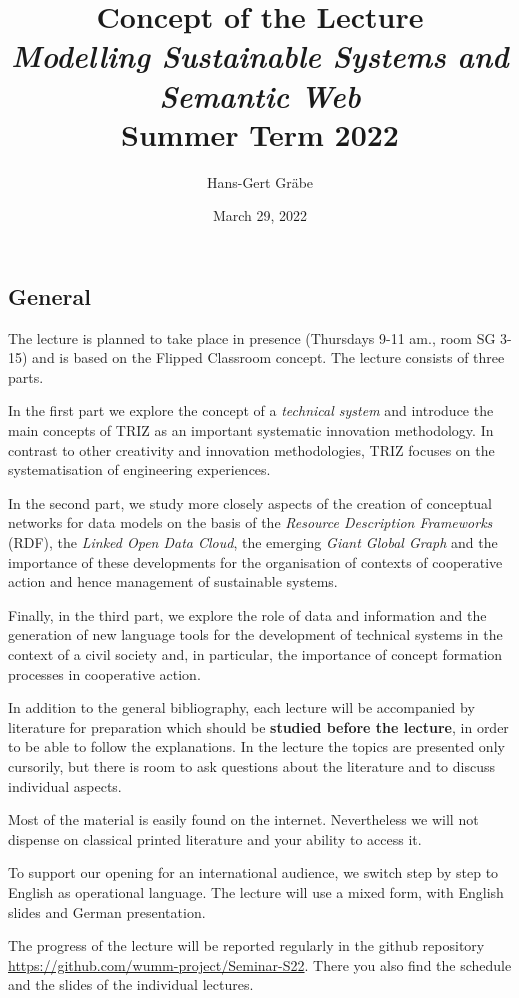 \documentclass[11pt,a4paper]{article}
\title{Concept of the Lecture \\[1em] \emph{Modelling Sustainable Systems and
    Semantic Web} \\[1em] Summer Term 2022}
\author{Hans-Gert Gr\"abe}
\date{March 29, 2022}
\begin{document}
\maketitle

\subsection{General}

The lecture is planned to take place in presence (Thursdays 9-11 am., room SG
3-15) and is based on the Flipped Classroom concept. The lecture consists of
three parts.

In the first part we explore the concept of a \emph{technical system} and
introduce the main concepts of TRIZ as an important systematic innovation
methodology.  In contrast to other creativity and innovation methodologies,
TRIZ focuses on the systematisation of engineering experiences.

In the second part, we study more closely aspects of the creation of
conceptual networks for data models on the basis of the \emph{Resource
  Description Frameworks} (RDF), the \emph{Linked Open Data Cloud}, the
emerging \emph{Giant Global Graph} and the importance of these developments
for the organisation of contexts of cooperative action and hence management of
sustainable systems.

Finally, in the third part, we explore the role of data and information and
the generation of new language tools for the development of technical systems
in the context of a civil society and, in particular, the importance of
concept formation processes in cooperative action.

In addition to the general bibliography, each lecture will be accompanied by
literature for preparation which should be \textbf{studied before the
  lecture}, in order to be able to follow the explanations. In the lecture the
topics are presented only cursorily, but there is room to ask questions about
the literature and to discuss individual aspects.

Most of the material is easily found on the internet. Nevertheless we will not
dispense on classical printed literature and your ability to access it.

To support our opening for an international audience, we switch step by step
to English as operational language. The lecture will use a mixed form, with
English slides and German presentation.

The progress of the lecture will be reported regularly in the github
repository \url{https://github.com/wumm-project/Seminar-S22}. There you also
find the schedule and the slides of the individual lectures.
\end{document}
